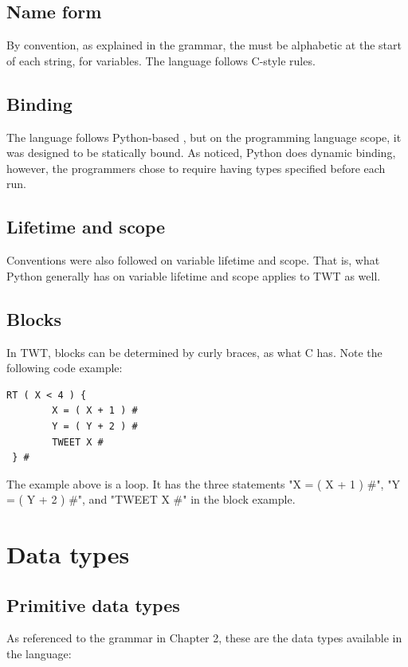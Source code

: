 \documentclass[11pt,a4paper]{report}
\begin{document}
\section{Name form}

By convention, as explained in the grammar, the  must be
alphabetic at the start of each string, for variables. The language follows C-style rules.

\section{Binding}

The language follows Python-based , but on the programming
language scope, it was designed to be statically bound. As noticed, Python does dynamic
binding, however, the programmers chose to require having types specified before
each run.

\section{Lifetime and scope}

Conventions were also followed on variable lifetime and scope. That is, what
Python generally has on variable lifetime and scope applies to TWT as well.

\section{Blocks}

In TWT, blocks can be determined by curly braces, as what C has. Note the
following code example:

\begin{lstlisting}
RT ( X < 4 ) { 
		X = ( X + 1 ) #
		Y = ( Y + 2 ) #
		TWEET X #
 } #
\end{lstlisting}

The example above is a loop. It has the three statements "X = ( X + 1 ) \#", "Y
= ( Y + 2 ) \#", and "TWEET X \#" in the block example.

\chapter{Data types}

\section{Primitive data types}

As referenced to the grammar in Chapter 2, these are the data types available in the language:
\end{document}
